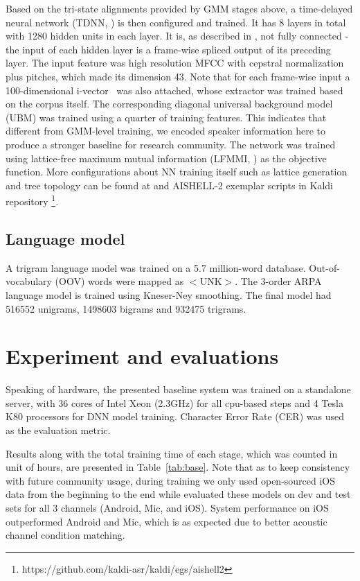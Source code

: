 \documentclass[a4paper]{article}
\begin{document}
Based on the tri-state alignments provided by GMM stages above, a time-delayed neural network (TDNN, \cite{tdnn}) is then configured and trained. It has 8 layers in total with 1280 hidden units in each layer. It is, as described in \cite{tdnn}, not fully connected - the input of each hidden layer is a frame-wise spliced output of its preceding layer. The input feature was high resolution MFCC with cepstral normalization plus pitches, which made its dimension 43. Note that for each frame-wise input a 100-dimensional i-vector~\cite{ivector} was also attached, whose extractor was trained based on the corpus itself. The corresponding diagonal universal background model (UBM) was trained using a quarter of training features. This indicates that different from GMM-level training, we encoded speaker information here to produce a stronger baseline for research community. The network was trained using lattice-free maximum mutual information (LFMMI, \cite{lfmmi}) as the objective function. More configurations about NN training itself such as lattice generation and tree topology can be found at \cite{lfmmi} and AISHELL-2 exemplar scripts in Kaldi repository \footnote{https://github.com/kaldi-asr/kaldi/egs/aishell2}.

\subsection{Language model}

A trigram language model was trained on a 5.7 million-word database. Out-of-vocabulary (OOV) words were mapped as $<$UNK$>$. The 3-order ARPA language model is trained using Kneser-Ney smoothing. The final model had 516552 unigrams, 1498603 bigrams and 932475 trigrams.

\section{Experiment and evaluations}

Speaking of hardware, the presented baseline system was trained on a standalone server, with 36 cores of Intel Xeon (2.3GHz) for all cpu-based steps and 4
Tesla K80 processors for DNN model training. Character Error Rate (CER) was used as the evaluation metric. 

Results along with the total training time of each stage, which was counted in unit of hours, are presented in Table~\ref{tab:base}. 
Note that as to keep consistency with future community usage, during training we only used open-sourced iOS data from the beginning to the end while evaluated these models on dev and test sets for all 3 channels (Android, Mic, and iOS). System performance on iOS outperformed Android and Mic, which is as expected due to better acoustic channel condition matching.
\end{document}
